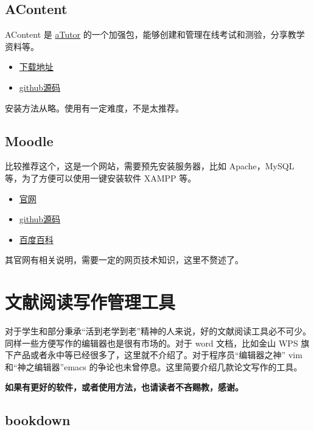 \documentclass[doctor,openright,twoside]{sjtuthesis}
\providecommand{\tightlist}{%
    \setlength{\itemsep}{0pt}\setlength{\parskip}{0pt}}
\theoremstyle{plain}
\theoremstyle{definition}
\theoremstyle{remark}
\theoremstyle{ocrenumbox}
\theoremstyle{plain}
\begin{document}
\hypertarget{acontent}{%
\subsection{AContent}\label{acontent}}

AContent 是 \href{https://github.com/atutor?tab=repositories}{aTutor} 的一个加强包，能够创建和管理在线考试和测验，分享教学资料等。

\begin{itemize}
\tightlist
\item
  \href{https://atutor.github.io/acontent/downloads.html}{下载地址}
\item
  \href{https://github.com/atutor/AContent}{github源码}
\end{itemize}

安装方法从略。使用有一定难度，不是太推荐。

\hypertarget{moodle}{%
\subsection{Moodle}\label{moodle}}

比较推荐这个，这是一个网站，需要预先安装服务器，比如 Apache，MySQL 等，为了方便可以使用一键安装软件 XAMPP 等。

\begin{itemize}
\tightlist
\item
  \href{https://moodle.org/}{官网}
\item
  \href{https://github.com/moodle/moodle}{github源码}
\item
  \href{https://baike.baidu.com/item/moodle}{百度百科}
\end{itemize}

其官网有相关说明，需要一定的网页技术知识，这里不赘述了。

\hypertarget{section-39}{%
\section{文献阅读写作管理工具}\label{section-39}}

对于学生和部分秉承``活到老学到老''精神的人来说，好的文献阅读工具必不可少。同样一些方便写作的编辑器也是很有市场的。对于 word 文档，比如金山 WPS 旗下产品或者永中等已经很多了，这里就不介绍了。对于程序员``编辑器之神'' vim 和``神之编辑器''emacs 的争论也未曾停息。这里简要介绍几款论文写作的工具。

\textbf{如果有更好的软件，或者使用方法，也请读者不吝赐教，感谢。}

\hypertarget{bookdown}{%
\subsection{bookdown}\label{bookdown}}
\end{document}
